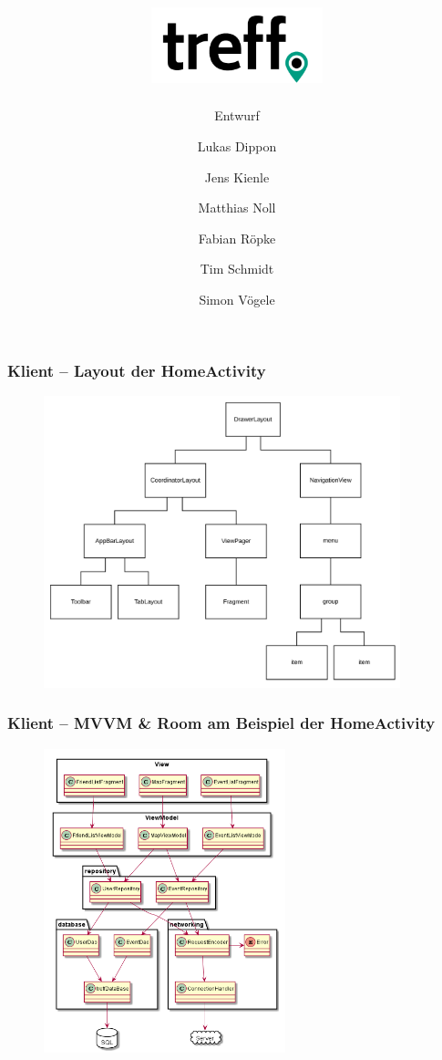 \documentclass[aspectratio=1610]{beamer}
\title{\includegraphics[width = 50mm]{images/logo_crop.png}}
\subtitle{\huge Entwurf}
\author{Lukas Dippon
	\and Jens Kienle
	\and Matthias Noll
	\and Fabian Röpke
	\and Tim Schmidt
	\and Simon Vögele}
\begin{document}
	\begin{frame}[plain]
	\maketitle
	\end{frame}


    \begin{frame}[plain]
        \frametitle{\textbf{Klient} -- Layout der HomeActivity}
        \begin{figure}[!htb]
            \centering
            \includegraphics[height = 240pt]{images/activity-home-layout.png}
        \end{figure}
    \end{frame}

	\begin{frame}[plain]
        \frametitle{\textbf{Klient} -- MVVM \& Room am Beispiel der HomeActivity}
        \begin{figure}[!htb]
            \centering
            \includegraphics[height = 250pt]{images/database.png}
        \end{figure}
	\end{frame}
\end{document}
